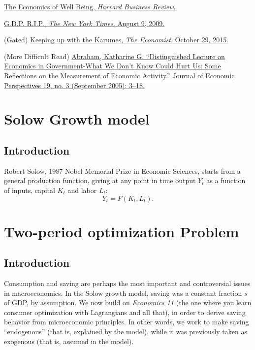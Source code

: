\documentclass[]{book}
\theoremstyle{definition}
\theoremstyle{definition}
\theoremstyle{definition}
\theoremstyle{remark}
\begin{document}
\href{https://hbr.org/2012/01/the-economics-of-well-being}{The Economics
of Well Being, \emph{Harvard Business Review}.}

\href{https://search.proquest.com/hnpnewyorktimes/docview/1030670685/A9EF0C9A254D4699PQ/1?accountid=14512}{G.D.P.
R.I.P., \emph{The New York Times}, August 9, 2009.}

(Gated)
\href{https://www.economist.com/news/finance-and-economics/21677223-new-study-shows-money-can-buy-you-happinessbut-only-fleetingly-others}{Keeping
up with the Karumes, \emph{The Economist}, October 29, 2015.}

(More Difficult Read)
\href{https://doi.org/10.1257/089533005774357833}{Abraham, Katharine G.
``Distinguished Lecture on Economics in Government-What We Don't Know
Could Hurt Us: Some Reflections on the Measurement of Economic
Activity.'' Journal of Economic Perspectives 19, no. 3 (September 2005):
3--18.}

\chapter{Solow Growth model}\label{solow-growth-model}

\section*{Introduction}\label{introduction}

Robert Solow, 1987 Nobel Memorial Prize in Economic Sciences, starts
from a general production function, giving at any point in time output
\(Y_t\) as a function of inputs, capital \(K_t\) and labor \(L_t\):
\[Y_t=F\left(K_t,L_t\right).\]

\chapter{Two-period optimization
Problem}\label{two-period-optimization-problem}

\section{Introduction}\label{introduction-1}

Consumption and saving are perhaps the most important and controversial
issues in macroeconomics. In the Solow growth model, saving was a
constant fraction \(s\) of GDP, by assumption. We now build on
\emph{Economics 11} (the one where you learn consumer optimization with
Lagrangians and all that), in order to derive saving behavior from
microeconomic principles. In other words, we work to make saving
``endogenous'' (that is, explained by the model), while it was
previously taken as exogenous (that is, assumed in the model).
\end{document}
